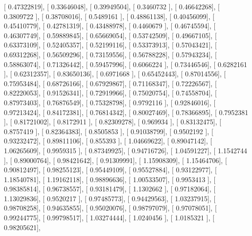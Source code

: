 \documentclass{article}
\begin{document}
       [ 0.47322819],
       [ 0.33646048],
       [ 0.39949504],
       [ 0.3460732 ],
       [ 0.46642268],
       [ 0.3809722 ],
       [ 0.38708016],
       [ 0.5489161 ],
       [ 0.48861138],
       [ 0.40456099],
       [ 0.45410779],
       [ 0.42781319],
       [ 0.43488978],
       [ 0.4460679 ],
       [ 0.46745594],
       [ 0.46307749],
       [ 0.59889845],
       [ 0.65669054],
       [ 0.53742509],
       [ 0.49667105],
       [ 0.63373109],
       [ 0.52405357],
       [ 0.52199116],
       [ 0.53373913],
       [ 0.57043421],
       [ 0.69312268],
       [ 0.56509296],
       [ 0.73159556],
       [ 0.56788228],
       [ 0.57943234],
       [ 0.58863074],
       [ 0.71326442],
       [ 0.59457996],
       [ 0.6066224 ],
       [ 0.73446546],
       [ 0.6282161 ],
       [ 0.62312357],
       [ 0.83650136],
       [ 0.6971668 ],
       [ 0.65452443],
       [ 0.87014556],
       [ 0.75953484],
       [ 0.68726166],
       [ 0.67929867],
       [ 0.71168347],
       [ 0.72226567],
       [ 0.82220053],
       [ 0.91526341],
       [ 0.72919966],
       [ 0.75020754],
       [ 0.74558704],
       [ 0.87973403],
       [ 0.76876549],
       [ 0.75328798],
       [ 0.9792116 ],
       [ 0.92846016],
       [ 0.97213424],
       [ 0.84172381],
       [ 0.76814342],
       [ 0.80027469],
       [ 0.78366895],
       [ 0.7952381 ],
       [ 0.81721002],
       [ 0.8172911 ],
       [ 0.82309278],
       [ 0.969934  ],
       [ 0.83132475],
       [ 0.8757419 ],
       [ 0.82364383],
       [ 0.8505853 ],
       [ 0.91038799],
       [ 0.9502192 ],
       [ 0.93232472],
       [ 0.89811106],
       [ 0.855393  ],
       [ 1.04669622],
       [ 0.89047142],
       [ 1.06265609],
       [ 0.9959315 ],
       [ 0.87349925],
       [ 0.94716726],
       [ 1.04591227],
       [ 1.1542744 ],
       [ 0.89000764],
       [ 0.98421642],
       [ 0.91309991],
       [ 1.15908309],
       [ 1.15464706],
       [ 0.90812497],
       [ 0.98255123],
       [ 0.95449109],
       [ 0.95527884],
       [ 0.93122977],
       [ 1.18540781],
       [ 1.19162118],
       [ 0.98896636],
       [ 1.00533507],
       [ 0.9953413 ],
       [ 0.98385814],
       [ 0.96738557],
       [ 0.93181479],
       [ 1.1302662 ],
       [ 0.97182064],
       [ 1.13029836],
       [ 0.9520217 ],
       [ 0.97485773],
       [ 0.94429563],
       [ 1.03237915],
       [ 0.98708258],
       [ 0.94635855],
       [ 0.95020076],
       [ 0.98797079],
       [ 0.97078051],
       [ 0.99244775],
       [ 0.99798517],
       [ 1.03274444],
       [ 1.0240456 ],
       [ 1.0185321 ],
       [ 0.98205621],
\end{document}
